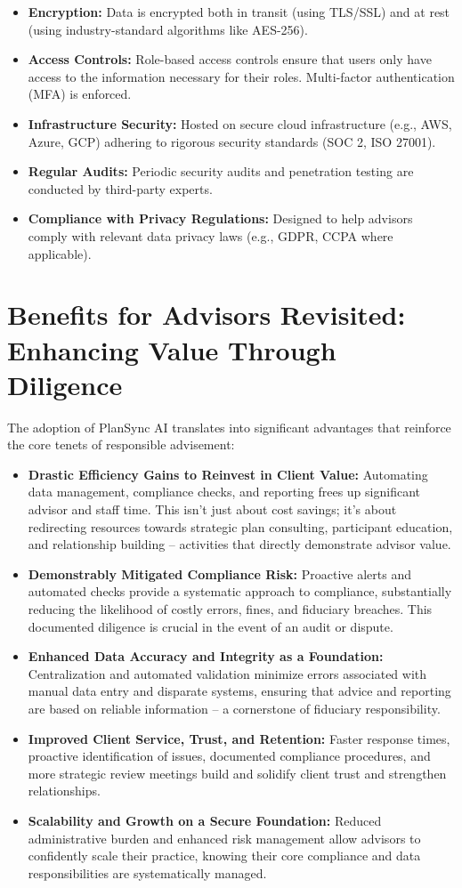 \documentclass[11pt]{article} %
\begin{document}
\begin{itemize}[leftmargin=*]
    \item \textbf{Encryption:} Data is encrypted both in transit (using TLS/SSL) and at rest (using industry-standard algorithms like AES-256).
    \item \textbf{Access Controls:} Role-based access controls ensure that users only have access to the information necessary for their roles. Multi-factor authentication (MFA) is enforced.
    \item \textbf{Infrastructure Security:} Hosted on secure cloud infrastructure (e.g., AWS, Azure, GCP) adhering to rigorous security standards (SOC 2, ISO 27001).
    \item \textbf{Regular Audits:} Periodic security audits and penetration testing are conducted by third-party experts.
    \item \textbf{Compliance with Privacy Regulations:} Designed to help advisors comply with relevant data privacy laws (e.g., GDPR, CCPA where applicable).
\end{itemize}

\section{Benefits for Advisors Revisited: Enhancing Value Through Diligence}
The adoption of PlanSync AI translates into significant advantages that reinforce the core tenets of responsible advisement:
\begin{itemize}[leftmargin=*]
    \item \textbf{Drastic Efficiency Gains to Reinvest in Client Value:} Automating data management, compliance checks, and reporting frees up significant advisor and staff time. This isn't just about cost savings; it's about redirecting resources towards strategic plan consulting, participant education, and relationship building – activities that directly demonstrate advisor value.
    \item \textbf{Demonstrably Mitigated Compliance Risk:} Proactive alerts and automated checks provide a systematic approach to compliance, substantially reducing the likelihood of costly errors, fines, and fiduciary breaches. This documented diligence is crucial in the event of an audit or dispute.
    \item \textbf{Enhanced Data Accuracy and Integrity as a Foundation:} Centralization and automated validation minimize errors associated with manual data entry and disparate systems, ensuring that advice and reporting are based on reliable information – a cornerstone of fiduciary responsibility.
    \item \textbf{Improved Client Service, Trust, and Retention:} Faster response times, proactive identification of issues, documented compliance procedures, and more strategic review meetings build and solidify client trust and strengthen relationships.
    \item \textbf{Scalability and Growth on a Secure Foundation:} Reduced administrative burden and enhanced risk management allow advisors to confidently scale their practice, knowing their core compliance and data responsibilities are systematically managed.
\end{itemize}
\end{document}
